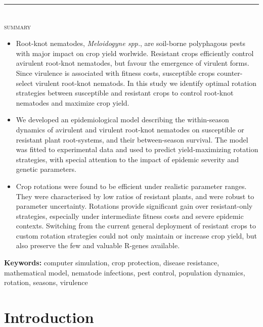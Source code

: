 {
\bigskip
\noindent\rule{\linewidth}{.2mm} \\[5mm]
\textsc{summary}
\medskip

\begin{itemize}
\item Root-knot nematodes, \textit{Meloidogyne spp.}, are soil-borne
  polyphagous pests with major impact on crop yield
  worlwide. Resistant crops efficiently control avirulent root-knot
  nematodes, but favour the emergence of virulent
  forms. Since virulence is associated with fitness costs,
  susceptible crops counter-select virulent root-knot nematods.  In
  this study we identify optimal rotation strategies between
  susceptible and resistant crops to control root-knot nematodes and
  maximize crop yield.
\item We developed an epidemiological model describing the
  within-season dynamics of avirulent and virulent root-knot nematodes
  on susceptible or resistant plant root-systems, and their
  between-season survival. The model was fitted to experimental data
  and used to predict yield-maximizing rotation strategies, with
  special attention to the impact of epidemic severity and genetic
  parameters.
\item Crop rotations were found to be efficient under realistic
  parameter ranges. They were characterised by low ratios of resistant
  plants, and were robust to parameter uncertainty. Rotations provide
  significant gain over resistant-only strategies, especially under
  intermediate fitness costs and severe epidemic contexts. Switching
  from the current general deployment of resistant crops to custom
  rotation strategies could not only maintain or increase crop yield,
  but also preserve the few and valuable R-genes available.
\end{itemize}

\par\noindent\textbf{Keywords:} computer simulation, crop protection, disease resistance, mathematical model, nematode infections, pest control, population dynamics, rotation, seasons, virulence





\section{Introduction}

}
